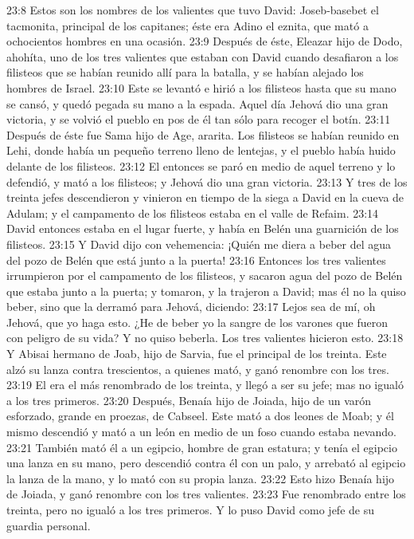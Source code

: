 23:8 Estos son los nombres de los valientes que tuvo David: Joseb-basebet el tacmonita, principal de los capitanes; éste era Adino el eznita, que mató a ochocientos hombres en una ocasión.  
23:9 Después de éste, Eleazar hijo de Dodo, ahohíta, uno de los tres valientes que estaban con David cuando desafiaron a los filisteos que se habían reunido allí para la batalla, y se habían alejado los hombres de Israel.  
23:10 Este se levantó e hirió a los filisteos hasta que su mano se cansó, y quedó pegada su mano a la espada. Aquel día Jehová dio una gran victoria, y se volvió el pueblo en pos de él tan sólo para recoger el botín.  
23:11 Después de éste fue Sama hijo de Age, ararita. Los filisteos se habían reunido en Lehi, donde había un pequeño terreno lleno de lentejas, y el pueblo había huido delante de los filisteos.  
23:12 El entonces se paró en medio de aquel terreno y lo defendió, y mató a los filisteos; y Jehová dio una gran victoria.  
23:13 Y tres de los treinta jefes descendieron y vinieron en tiempo de la siega a David en la cueva de Adulam; y el campamento de los filisteos estaba en el valle de Refaim.  
23:14 David entonces estaba en el lugar fuerte, y había en Belén una guarnición de los filisteos.  
23:15 Y David dijo con vehemencia: ¡Quién me diera a beber del agua del pozo de Belén que está junto a la puerta!  
23:16 Entonces los tres valientes irrumpieron por el campamento de los filisteos, y sacaron agua del pozo de Belén que estaba junto a la puerta; y tomaron, y la trajeron a David; mas él no la quiso beber, sino que la derramó para Jehová, diciendo:  
23:17 Lejos sea de mí, oh Jehová, que yo haga esto. ¿He de beber yo la sangre de los varones que fueron con peligro de su vida? Y no quiso beberla. Los tres valientes hicieron esto.  
23:18 Y Abisai hermano de Joab, hijo de Sarvia, fue el principal de los treinta. Este alzó su lanza contra trescientos, a quienes mató, y ganó renombre con los tres.  
23:19 El era el más renombrado de los treinta, y llegó a ser su jefe; mas no igualó a los tres primeros.  
23:20 Después, Benaía hijo de Joiada, hijo de un varón esforzado, grande en proezas, de Cabseel. Este mató a dos leones de Moab; y él mismo descendió y mató a un león en medio de un foso cuando estaba nevando.  
23:21 También mató él a un egipcio, hombre de gran estatura; y tenía el egipcio una lanza en su mano, pero descendió contra él con un palo, y arrebató al egipcio la lanza de la mano, y lo mató con su propia lanza.  
23:22 Esto hizo Benaía hijo de Joiada, y ganó renombre con los tres valientes.  
23:23 Fue renombrado entre los treinta, pero no igualó a los tres primeros. Y lo puso David como jefe de su guardia personal. 
